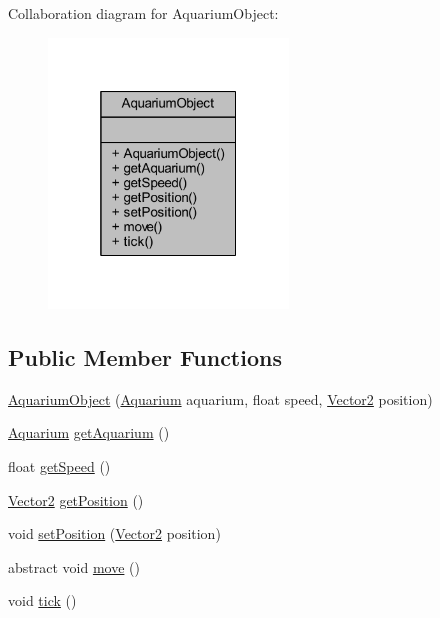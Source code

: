 Collaboration diagram for Aquarium\+Object\+:
\nopagebreak
\begin{figure}[H]
\begin{center}
\leavevmode
\includegraphics[width=181pt]{class_aquarium_object__coll__graph}
\end{center}
\end{figure}
\subsection*{Public Member Functions}
\begin{DoxyCompactItemize}
\item 
\mbox{\hyperlink{class_aquarium_object_a67f4bfdbab6fb8083e406a89ed3befb4}{Aquarium\+Object}} (\mbox{\hyperlink{class_aquarium}{Aquarium}} aquarium, float speed, \mbox{\hyperlink{class_vector2}{Vector2}} position)
\item 
\mbox{\hyperlink{class_aquarium}{Aquarium}} \mbox{\hyperlink{class_aquarium_object_a16e297f43ec3cf4d7778bffdb4dc13a8}{get\+Aquarium}} ()
\item 
float \mbox{\hyperlink{class_aquarium_object_afa94a029183090fbbae21e81f06f181b}{get\+Speed}} ()
\item 
\mbox{\hyperlink{class_vector2}{Vector2}} \mbox{\hyperlink{class_aquarium_object_af309f1ea5f4ce452d94068ed6e40db3b}{get\+Position}} ()
\item 
void \mbox{\hyperlink{class_aquarium_object_a5627326c979d8a0edbfea4701ce10bf0}{set\+Position}} (\mbox{\hyperlink{class_vector2}{Vector2}} position)
\item 
abstract void \mbox{\hyperlink{class_aquarium_object_a3847ea02c5aa433f9164682250a46182}{move}} ()
\item 
void \mbox{\hyperlink{class_aquarium_object_a0ca7dc571fc2fb4d34d44e2cb37292e0}{tick}} ()
\end{DoxyCompactItemize}


